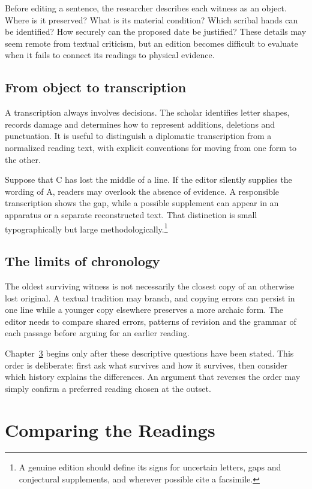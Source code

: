 \documentclass{impebook}
\begin{document}
Before editing a sentence, the researcher describes each
witness as an object. Where is it preserved? What is its
material condition? Which scribal hands can be identified?
How securely can the proposed date be justified? These
details may seem remote from textual criticism, but an
edition becomes difficult to evaluate when it fails to
connect its readings to physical evidence.

\section{From object to transcription}
A transcription always involves decisions. The scholar
identifies letter shapes, records damage and determines
how to represent additions, deletions and punctuation.
It is useful to distinguish a diplomatic transcription
from a normalized reading text, with explicit conventions
for moving from one form to the other.

Suppose that C has lost the middle of a line. If the editor
silently supplies the wording of A, readers may overlook
the absence of evidence. A responsible transcription
shows the gap, while a possible supplement can appear
in an apparatus or a separate reconstructed text.
That distinction is small typographically but large
methodologically.\footnote{A genuine edition should define
its signs for uncertain letters, gaps and conjectural
supplements, and wherever possible cite a facsimile.}

\section{The limits of chronology}
The oldest surviving witness is not necessarily the
closest copy of an otherwise lost original. A textual
tradition may branch, and copying errors can persist in
one line while a younger copy elsewhere preserves a
more archaic form. The editor needs to compare shared
errors, patterns of revision and the grammar of each
passage before arguing for an earlier reading.

Chapter~\ref{chap:compare} begins only after these
descriptive questions have been stated. This order is
deliberate: first ask what survives and how it survives,
then consider which history explains the differences.
An argument that reverses the order may simply confirm
a preferred reading chosen at the outset.

\chapter{Comparing the Readings}\label{chap:compare}
\end{document}
